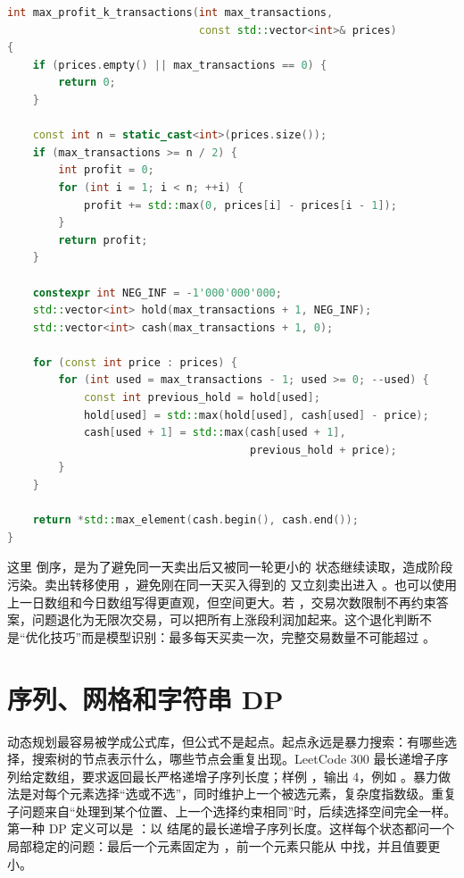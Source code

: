 \begin{lstlisting}[language=C++,caption={LeetCode 188 买卖股票 IV：交易次数进入状态}]
int max_profit_k_transactions(int max_transactions,
                              const std::vector<int>& prices)
{
    if (prices.empty() || max_transactions == 0) {
        return 0;
    }

    const int n = static_cast<int>(prices.size());
    if (max_transactions >= n / 2) {
        int profit = 0;
        for (int i = 1; i < n; ++i) {
            profit += std::max(0, prices[i] - prices[i - 1]);
        }
        return profit;
    }

    constexpr int NEG_INF = -1'000'000'000;
    std::vector<int> hold(max_transactions + 1, NEG_INF);
    std::vector<int> cash(max_transactions + 1, 0);

    for (const int price : prices) {
        for (int used = max_transactions - 1; used >= 0; --used) {
            const int previous_hold = hold[used];
            hold[used] = std::max(hold[used], cash[used] - price);
            cash[used + 1] = std::max(cash[used + 1],
                                      previous_hold + price);
        }
    }

    return *std::max_element(cash.begin(), cash.end());
}
\end{lstlisting}

这里  倒序，是为了避免同一天卖出后又被同一轮更小的  状态继续读取，造成阶段污染。卖出转移使用 ，避免刚在同一天买入得到的  又立刻卖出进入 。也可以使用上一日数组和今日数组写得更直观，但空间更大。若 ，交易次数限制不再约束答案，问题退化为无限次交易，可以把所有上涨段利润加起来。这个退化判断不是“优化技巧”而是模型识别：最多每天买卖一次，完整交易数量不可能超过 。

\section{序列、网格和字符串 DP}

动态规划最容易被学成公式库，但公式不是起点。起点永远是暴力搜索：有哪些选择，搜索树的节点表示什么，哪些节点会重复出现。LeetCode 300 最长递增子序列给定数组，要求返回最长严格递增子序列长度；样例 ，输出 4，例如 \code{[2,3,7,101]}。暴力做法是对每个元素选择“选或不选”，同时维护上一个被选元素，复杂度指数级。重复子问题来自“处理到某个位置、上一个选择约束相同”时，后续选择空间完全一样。第一种 DP 定义可以是 ：以  结尾的最长递增子序列长度。这样每个状态都问一个局部稳定的问题：最后一个元素固定为 ，前一个元素只能从  中找，并且值要更小。

